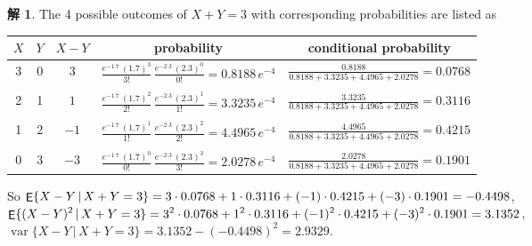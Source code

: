 \documentclass[12pt]{extarticle}
\newcommand{\ds}{\displaystyle}
\DeclareMathOperator\expc{{\sf E}}
\DeclareMathOperator\var{var}
\theoremstyle{definition}
\newtheorem*{sol}{解}
\begin{document}
\begin{sol}
  The 4 possible outcomes of $X + Y = 3$ with corresponding probabilities are listed as

  \begin{table}[!htbp]
    \centering
    \begin{tabular}{ccccc}
      \toprule
      $X$ & $Y$ & $X - Y$ & probability & conditional probability \\
      \midrule
      3 & 0 & $3$ & $\ds\frac{e^{-1.7}\,(1.7)^3}{3!}\,\frac{e^{-2.3}\,(2.3)^0}{0!} = 0.8188\,e^{-4}$ & $\ds\frac{0.8188}{0.8188 + 3.3235 + 4.4965 + 2.0278} = 0.0768$\\
      \\[-2mm]
      2 & 1 & $1$ & $\ds\frac{e^{-1.7}\,(1.7)^2}{2!}\,\frac{e^{-2.3}\,(2.3)^1}{1!} = 3.3235\,e^{-4}$ & $\ds\frac{3.3235}{0.8188 + 3.3235 + 4.4965 + 2.0278} = 0.3116$\\
      \\[-2mm]
      1 & 2 & $-1$ & $\ds\frac{e^{-1.7}\,(1.7)^1}{1!}\,\frac{e^{-2.3}\,(2.3)^2}{2!} = 4.4965\,e^{-4}$ & $\ds\frac{4.4965}{0.8188 + 3.3235 + 4.4965 + 2.0278} = 0.4215$\\
      \\[-2mm]
      0 & 3 & $-3$ & $\ds\frac{e^{-1.7}\,(1.7)^0}{0!}\,\frac{e^{-2.3}\,(2.3)^3}{3!} = 2.0278\,e^{-4}$ & $\ds\frac{2.0278}{0.8188 + 3.3235 + 4.4965 + 2.0278} = 0.1901$\\
      \bottomrule
    \end{tabular}
  \end{table}

  \noindent So $\ds\expc\{X - Y\,|\,X + Y = 3\} = 3\cdot 0.0768 + 1\cdot 0.3116 + (-1)\cdot 0.4215 + (-3)\cdot 0.1901 = -0.4498$, $\ds\expc\{(X - Y)^2\,|\,X + Y = 3\} = 3^2\cdot 0.0768 + 1^2\cdot 0.3116 + (-1)^2\cdot 0.4215 + (-3)^2\cdot 0.1901 = 3.1352$, $\var\{X - Y\,|\,X + Y = 3\} = 3.1352 - (-0.4498)^2 = 2.9329$.
\end{sol}
\end{document}
